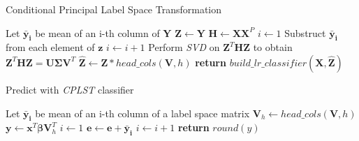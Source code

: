\begin{algorithm}
    \caption{Conditional Principal Label Space Transformation}\label{alg:cplst1}
    \begin{algorithmic}[1]
            \State Let $\boldsymbol{\bar{y}_i}$ be mean of an i-th column of $\boldsymbol{Y}$
            \State $\boldsymbol{Z} \gets \boldsymbol{Y}$
            \State $\boldsymbol{H} \gets \boldsymbol{X}\boldsymbol{X}^P$
            \State $i \gets 1$
                \State Substruct $\boldsymbol{\bar{y}_i}$ from each element of $\boldsymbol{z}$ 
                \State $i \gets i+1$ 
            \EndFor
            \State Perform \textit{SVD} on $\boldsymbol{Z}^T\boldsymbol{H}\boldsymbol{Z}$ to obtain $\boldsymbol{Z}^T\boldsymbol{H}\boldsymbol{Z}=\boldsymbol{U}\boldsymbol{\Sigma} \boldsymbol{V}^T$
            \State $\boldsymbol{\hat{Z}} \gets \boldsymbol{Z} * head\_cols(\boldsymbol{V},h)$
            \State \textbf{return} $build\_lr\_classifier(\boldsymbol{X}, \boldsymbol{\hat{Z}})$
        \EndFunction
    \end{algorithmic}
\end{algorithm}


\begin{algorithm}
    \caption{Predict with \textit{CPLST} classifier}\label{alg:cplst2}
    \begin{algorithmic}[1]
            \State Let $\boldsymbol{\bar{y}_i}$ be mean of an i-th column of a label space matrix
            \State $\boldsymbol{V}_h \gets head\_cols(\boldsymbol{V}, h)$
            \State $\boldsymbol{y} \gets \boldsymbol{x}^T\boldsymbol{\beta}\boldsymbol{V}_h^T$
            \State $i \gets 1$
            \State $\boldsymbol{e} \gets \boldsymbol{e} + \boldsymbol{\bar{y}_i}$
                \State $i \gets i+1$
            \EndFor
            \State \textbf{return} $round(y)$
        \EndFunction
    \end{algorithmic}
\end{algorithm}


